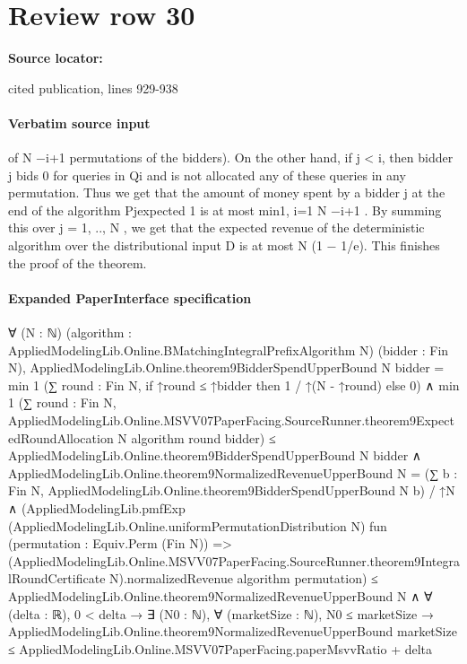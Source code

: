 \documentclass[10pt]{article}
\begin{document}
\section*{Review row 30}
\textbf{Source locator:} {\footnotesize\raggedright cited publication, lines 929-\allowbreak{}938\par}
\paragraph{Verbatim source input}
\begin{ReviewVerbatim}
of N −i+1
permutations of the bidders). On the other hand, if j < i, then bidder j bids 0 for queries in
Qi and is not allocated any of these queries in any permutation.
Thus we get that the
amount of money spent by a bidder j at the end of the algorithm
Pjexpected
1
is at most min{1, i=1 N −i+1 }. By summing this over j = 1, .., N , we get that the expected
revenue of the deterministic algorithm over the distributional input D is at most N (1 − 1/e).
This finishes the proof of the theorem.
\end{ReviewVerbatim}



\paragraph{Expanded PaperInterface specification}
\begin{ReviewVerbatim}
∀ (N : ℕ) (algorithm : AppliedModelingLib.Online.BMatchingIntegralPrefixAlgorithm N) (bidder : Fin N),
  AppliedModelingLib.Online.theorem9BidderSpendUpperBound N bidder =
      min 1 (∑ round : Fin N, if ↑round ≤ ↑bidder then 1 / ↑(N - ↑round) else 0) ∧
    min 1
          (∑ round : Fin N,
            AppliedModelingLib.Online.MSVV07PaperFacing.SourceRunner.theorem9ExpectedRoundAllocation N algorithm round
              bidder) ≤
        AppliedModelingLib.Online.theorem9BidderSpendUpperBound N bidder ∧
      AppliedModelingLib.Online.theorem9NormalizedRevenueUpperBound N =
          (∑ b : Fin N, AppliedModelingLib.Online.theorem9BidderSpendUpperBound N b) / ↑N ∧
        (AppliedModelingLib.pmfExp (AppliedModelingLib.Online.uniformPermutationDistribution N)
              fun (permutation : Equiv.Perm (Fin N)) =>
              (AppliedModelingLib.Online.MSVV07PaperFacing.SourceRunner.theorem9IntegralRoundCertificate
                    N).normalizedRevenue
                algorithm permutation) ≤
            AppliedModelingLib.Online.theorem9NormalizedRevenueUpperBound N ∧
          ∀ (delta : ℝ),
            0 < delta →
              ∃ (N0 : ℕ),
                ∀ (marketSize : ℕ),
                  N0 ≤ marketSize →
                    AppliedModelingLib.Online.theorem9NormalizedRevenueUpperBound marketSize ≤
                      AppliedModelingLib.Online.MSVV07PaperFacing.paperMsvvRatio + delta
\end{ReviewVerbatim}
\end{document}

